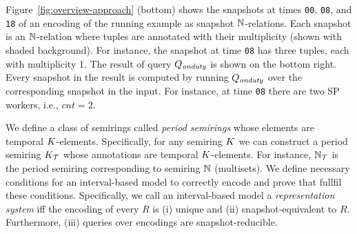 \begin{exam}
  Figure~\ref{fig:overview-approach} (bottom) shows the snapshots at
  times \texttt{00}, \texttt{08}, and \texttt{18} of an encoding of
  the running example as snapshot ${\mathbb{N}}$-relations.  Each snapshot
  is an ${\mathbb{N}}$-relation where tuples are annotated with their
  multiplicity (shown %
  with shaded
  background). For instance, the snapshot at time \texttt{08} has
  three tuples, each with multiplicity 1. The result of query
  $Q_\mathit{onduty}$ is shown on the bottom right.  Every snapshot in the
  result is computed by running $Q_\mathit{onduty}$ over the corresponding
  snapshot in the input.  For instance, at time \texttt{08} there are
  two SP workers, i.e., $cnt = 2$.
\end{exam}

\label{sec:logical-level}
%
%
%
We define a class of semirings called \textit{period semirings} whose elements are temporal $K$-elements.
Specifically, for any semiring $K$ we can construct a period semiring $K_{\mathcal{T}}$ whose annotations are temporal $K$-elements.
For instance, ${{\mathbb{N}}}_{\mathcal{T}}$ is the period semiring corresponding to semiring ${\mathbb{N}}$ (multisets).
We define necessary conditions for an interval-based model to
correctly encode \SKrels{}  and prove that
\periodKrels{} fullfil these conditions.  Specifically, we call an
interval-based model a \emph{representation system} iff
 the encoding of every \SKrel{} $R$ is (i) unique and (ii) snapshot-equivalent to $R$.
Furthermore, (iii) queries over encodings are
snapshot-reducible. %

